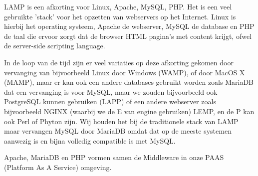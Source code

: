 LAMP is een afkorting voor Linux, Apache, MySQL, PHP. Het is een veel gebruikte 'stack' voor het opzetten van webservers op het Internet. Linux is hierbij het operating systeem, Apache de webserver, MySQL de database en PHP de taal die ervoor zorgt dat de browser HTML pagina's met content krijgt, ofwel de server-side scripting language.

In de loop van de tijd zijn er veel variaties op deze afkorting gekomen door vervanging van bijvoorbeeld Linux door Windows (WAMP), of door MacOS X (MAMP), maar er kan ook een andere databases gebruikt worden zoals MariaDB dat een vervanging is voor MySQL, maar we zouden bijvoorbeeld ook PostgreSQL kunnen gebruiken (LAPP) of een andere webserver zoals bijvoorbeeld NGINX (waarbij we de E van engine gebruiken) LEMP, en de P kan ook Perl of Phyton zijn. Wij houden het bij de traditionele stack van LAMP maar vervangen MySQL door MariaDB omdat dat op de meeste systemen aanwezig is en bijna volledig compatible is met MySQL.

Apache, MariaDB en PHP vormen samen de Middleware in onze PAAS (Platform As A Service) omgeving.

